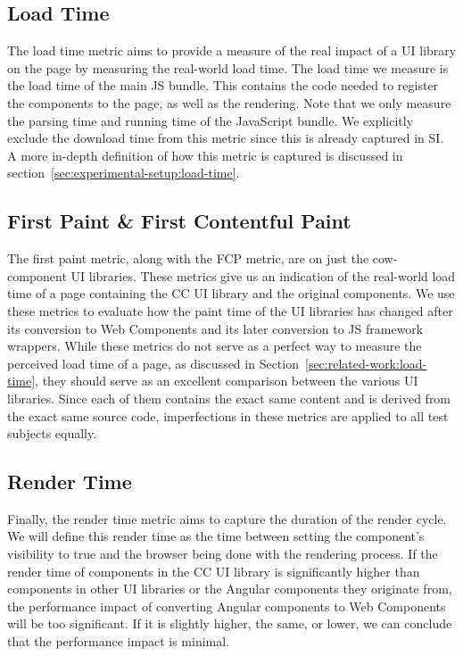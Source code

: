 \subsection{Load Time}
The load time metric aims to provide a measure of the real impact of a UI library on the page by measuring the real-world load time. The load time we measure is the load time of the main JS bundle. This contains the code needed to register the components to the page, as well as the rendering. Note that we only measure the parsing time and running time of the JavaScript bundle. We explicitly exclude the download time from this metric since this is already captured in SI\@. A more in-depth definition of how this metric is captured is discussed in section~\ref{sec:experimental-setup:load-time}.

\subsection{First Paint \& First Contentful Paint}
The first paint metric, along with the FCP metric, are on just the cow-component UI libraries. These metrics give us an indication of the real-world load time of a page containing the CC UI library and the original components. We use these metrics to evaluate how the paint time of the UI libraries has changed after its conversion to Web Components and its later conversion to JS framework wrappers. While these metrics do not serve as a perfect way to measure the perceived load time of a page, as discussed in Section~\ref{sec:related-work:load-time}, they should serve as an excellent comparison between the various UI libraries. Since each of them contains the exact same content and is derived from the exact same source code, imperfections in these metrics are applied to all test subjects equally.

\subsection{Render Time}
Finally, the render time metric aims to capture the duration of the render cycle. We will define this render time as the time between setting the component's visibility to true and the browser being done with the rendering process. If the render time of components in the CC UI library is significantly higher than components in other UI libraries or the Angular components they originate from, the performance impact of converting Angular components to Web Components will be too significant. If it is slightly higher, the same, or lower, we can conclude that the performance impact is minimal.

